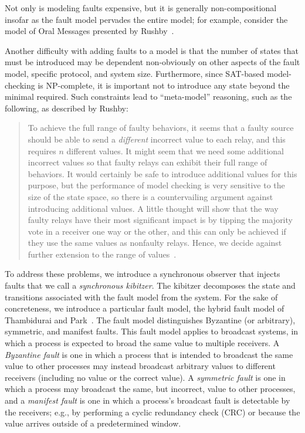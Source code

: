 \documentclass{llncs/llncs}
\begin{document}
Not only is modeling faults expensive, but it is generally non-compositional insofar as the fault model pervades the entire model; for example, consider the model of Oral Messages presented by Rushby~\cite{}.

Another difficulty with adding faults to a model is that the number of states that must be introduced may be dependent non-obviously on other aspects of the fault model, specific protocol, and system size. Furthermore, since SAT-based model-checking is NP-complete, it is important not to introduce any state beyond the minimal required. Such constraints lead to ``meta-model'' reasoning, such as the following, as described by Rushby:

\begin{quote}
To achieve the full range of faulty behaviors, it seems that a faulty source should be able to send a \emph{different} incorrect value to each relay, and this requires $n$ different values. It might seem that we need some additional incorrect values so that faulty relays can exhibit their full range of behaviors. It would certainly be safe to introduce additional values for this purpose, but the performance of model checking is very sensitive to the size of the state space, so there is a countervailing argument against introducing additional values. A little thought will show that the way faulty relays have their most significant impact is by tipping the majority vote in a receiver one way or the other, and this can only be achieved if they use the same values as nonfaulty relays. Hence, we decide against further extension to the range of values~\cite{}.
\end{quote}

To address these problems, we introduce a synchronous observer that injects faults that we call a \emph{synchronous kibitzer}. The kibitzer decomposes the state and transitions associated with the fault model from the system. For the sake of concreteness, we introduce a particular fault model, the hybrid fault model of Thambidurai and Park~\cite{}. The fault model distinguishes Byzantine (or arbitrary), symmetric, and manifest faults. This fault model applies to broadcast systems, in which a process is expected to broad the same value to multiple receivers. A \emph{Byzantine fault} is one in which a process that is intended to broadcast the same value to other processes may instead broadcast arbitrary values to different receivers (including no value or the correct value). A \emph{symmetric fault} is one in which a process may broadcast the same, but incorrect, value to other processes, and a \emph{manifest fault} is one in which a process's broadcast fault is detectable by the receivers; e.g., by performing a cyclic redundancy check (CRC) or because the value arrives outside of a predetermined window.
\end{document}
